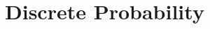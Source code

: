 \documentclass[../discrete.tex]{subfiles}
\begin{document}
\chapter{Discrete Probability}
\end{document}
